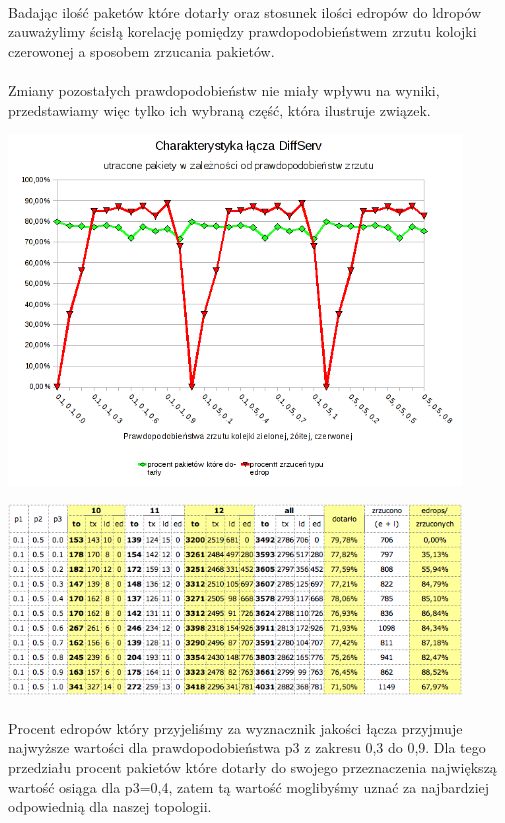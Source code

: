 \documentclass[a4paper]{article}
\begin{document}
\paragraph{}
Badając ilość paketów które dotarły oraz stosunek ilości edropów do ldropów zauważylimy ścisłą korelację pomiędzy prawdopodobieństwem zrzutu kolojki czerowonej a sposobem zrzucania pakietów.

\paragraph{}
Zmiany pozostałych prawdopodobieństw nie miały wpływu na wyniki, przedstawiamy więc tylko ich wybraną część, która ilustruje związek.


\includegraphics[width=120mm]{images/punkt_1_wykres.png}


\includegraphics[width=120mm]{images/punkt_1_tabela.png}

\paragraph{}
Procent edropów który przyjeliśmy za wyznacznik jakości łącza przyjmuje najwyższe wartości dla prawdopodobieństwa p3 z zakresu 0,3 do 0,9. Dla tego przedziału procent pakietów które dotarły do swojego przeznaczenia największą wartość osiąga dla p3=0,4, zatem tą wartość moglibyśmy uznać za najbardziej odpowiednią dla naszej topologii. 
\end{document}
